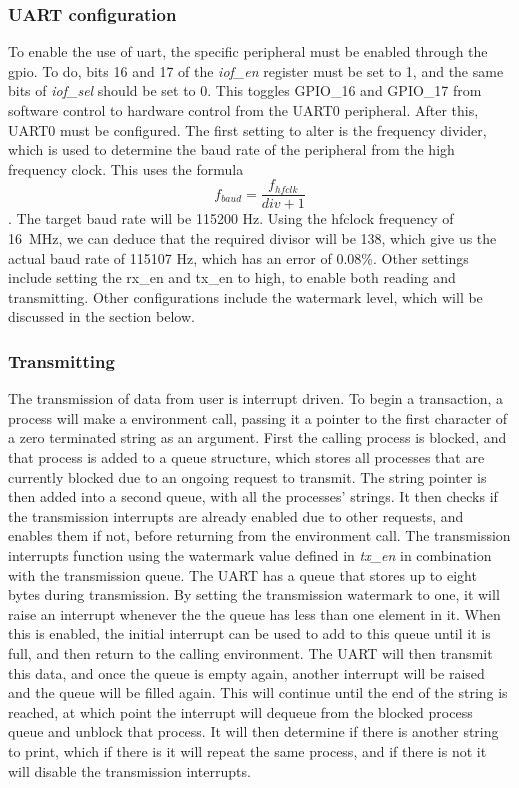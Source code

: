 \subsubsection{UART configuration}
To enable the use of \ac{uart}, the specific peripheral must be enabled through the \ac{gpio}. To do, bits 16 and 17 of the \textit{iof\_en} register must be set to 1, and the same bits of \textit{iof\_sel} should be set to 0. This toggles GPIO\_16 and GPIO\_17 from software control to hardware control from the UART0 peripheral. After this, UART0 must be configured. The first setting to alter is the frequency divider, which is used to determine the baud rate of the peripheral from the high frequency clock. This uses the formula \[f_{baud}=\frac{f_{hfclk}}{div+1}\]. The target baud rate will be 115200 Hz. Using the hfclock frequency of 16~MHz, we can deduce that the required divisor will be 138, which give us the actual baud rate of 115107 Hz, which has an error of 0.08\%. Other settings include setting the rx\_en and tx\_en to high, to enable both reading and transmitting. Other configurations include the watermark level, which will be discussed in the section below.
\subsubsection{Transmitting}
The transmission of data from user is interrupt driven. To begin a transaction, a process will make a environment call, passing it a pointer to the first character of a zero terminated string as an argument. First the calling process is blocked, and that process is added to a queue structure, which stores all processes that are currently blocked due to an ongoing request to transmit. The string pointer is then added into a second queue, with all the processes' strings. It then checks if the transmission interrupts are already enabled due to other requests, and enables them if not, before returning from the environment call. The transmission interrupts function using the watermark value defined in \textit{tx\_en} in combination with the transmission queue. The UART has a queue that stores up to eight bytes during transmission. By setting the transmission watermark to one, it will raise an interrupt whenever the the queue has less than one element in it. When this is enabled, the initial interrupt can be used to add to this queue until it is full, and then return to the calling environment. The UART will then transmit this data, and once the queue is empty again, another interrupt will be raised and the queue will be filled again. This will continue until the end of the string is reached, at which point the interrupt will dequeue from the blocked process queue and unblock that process. It will then determine if there is another string to print, which if there is it will repeat the same process, and if there is not it will disable the transmission interrupts.
